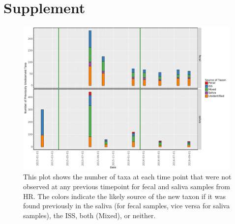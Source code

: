 
\section*{Supplement}

\setcounter{figure}{0}
\makeatletter 
\renewcommand{\thefigure}{S\@arabic\c@figure}
\makeatother

\begin{figure}
  \begin{center}
    \includegraphics[width=0.99\textwidth]{figs/hr_taxa_sources.png}
	\caption{\small{
	    This plot shows the number of taxa at each time point that were not observed at any previous timepoint for fecal and saliva samples from HR. The colors indicate the likely source of the new taxon if it was found previously in the saliva (for fecal samples, vice versa for saliva samples), the ISS, both (Mixed), or neither.
	}}
    \label{fig:hrtaxasource}
  \end{center}
\end{figure}

